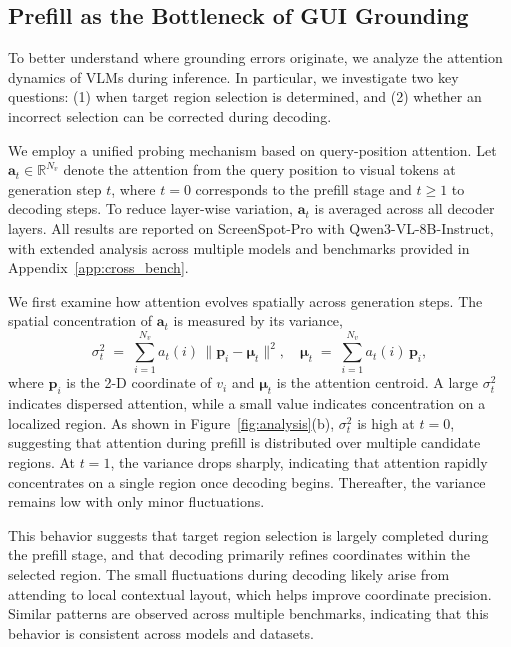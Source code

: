 \documentclass{article}
\begin{document}
\subsection{Prefill as the Bottleneck of GUI Grounding}
\label{sec:bottleneck}
To better understand where grounding errors originate, we analyze the attention dynamics of VLMs during inference. In particular, we investigate two key questions: (1) when target region selection is determined, and (2) whether an incorrect selection can be corrected during decoding.

We employ a unified probing mechanism based on query-position attention. Let $\mathbf{a}_t \in \mathbb{R}^{N_v}$ denote the attention from the query position to visual tokens at generation step $t$, where $t=0$ corresponds to the prefill stage and $t \ge 1$ to decoding steps. To reduce layer-wise variation, $\mathbf{a}_t$ is averaged across all decoder layers. All results are reported on ScreenSpot-Pro with Qwen3-VL-8B-Instruct, with extended analysis across multiple models and benchmarks provided in Appendix~\ref{app:cross_bench}.

We first examine how attention evolves spatially across generation steps. The spatial concentration of $\mathbf{a}_t$ is measured by its variance,
\begin{equation}
\sigma_t^2
\;=\;
\sum_{i=1}^{N_v} a_t(i)\,\bigl\|\mathbf{p}_i - \boldsymbol{\mu}_t\bigr\|^2,
\quad
\boldsymbol{\mu}_t
\;=\;
\sum_{i=1}^{N_v} a_t(i)\,\mathbf{p}_i,
\end{equation}
where $\mathbf{p}_i$ is the 2-D coordinate of $v_i$ and $\boldsymbol{\mu}_t$ is the attention centroid. A large $\sigma_t^2$ indicates dispersed attention, while a small value indicates concentration on a localized region.
As shown in Figure~\ref{fig:analysis}(b), $\sigma_t^2$ is high at $t=0$, suggesting that attention during prefill is distributed over multiple candidate regions. At $t=1$, the variance drops sharply, indicating that attention rapidly concentrates on a single region once decoding begins. Thereafter, the variance remains low with only minor fluctuations.

This behavior suggests that target region selection is largely completed during the prefill stage, and that decoding primarily refines coordinates within the selected region. The small fluctuations during decoding likely arise from attending to local contextual layout, which helps improve coordinate precision. Similar patterns are observed across multiple benchmarks, indicating that this behavior is consistent across models and datasets.
\end{document}
